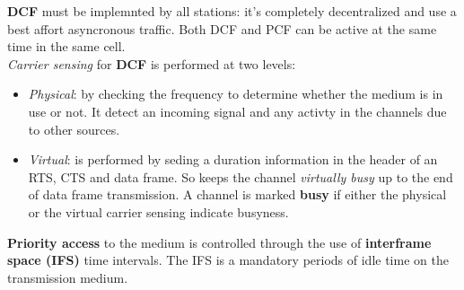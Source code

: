 \documentclass[10pt,a4paper]{report}
\theoremstyle{definition}
\begin{document}
\textbf{DCF} must be implemnted by all stations: it's completely decentralized and use a best affort asyncronous traffic. Both DCF and PCF can be active at the same time in the same cell.\\
\textit{Carrier sensing} for \textbf{DCF} is performed at two levels:
\begin{itemize}
	\item 
	\textit{Physical}: by checking the frequency to determine whether the medium is in use or not. It detect an incoming signal and any activty in the channels due to other sources.
	\item 
	\textit{Virtual}: is performed by seding a duration information in the header of an RTS, CTS and data frame. So keeps the channel \textit{virtually busy} up to the end of data frame transmission.
	A channel is marked \textbf{busy} if either the physical or the virtual carrier sensing indicate busyness.
\end{itemize}

\textbf{Priority access} to the medium is controlled through the use of \textbf{interframe space (IFS)} time intervals. The IFS is a mandatory periods of idle time on the transmission medium.
\end{document}
